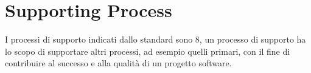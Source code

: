 \section{Supporting Process}
I processi di supporto indicati dallo standard \cite{bib:ISO12207_1997} sono 8, un processo di supporto ha lo scopo di supportare altri processi, ad esempio quelli primari, con il fine di contribuire al successo e alla qualità di un progetto software.

